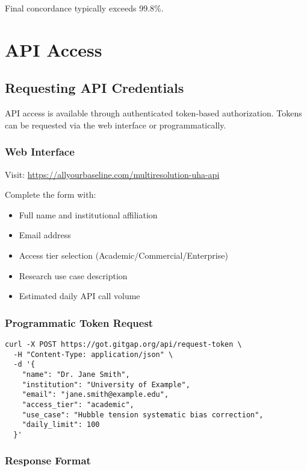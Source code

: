 \documentclass[11pt]{article}
\begin{document}
Final concordance typically exceeds 99.8\%.

\section{API Access}

\subsection{Requesting API Credentials}

API access is available through authenticated token-based authorization. Tokens can be requested via the web interface or programmatically.

\subsubsection{Web Interface}

Visit: \url{https://allyourbaseline.com/multiresolution-uha-api}

Complete the form with:
\begin{itemize}
    \item Full name and institutional affiliation
    \item Email address
    \item Access tier selection (Academic/Commercial/Enterprise)
    \item Research use case description
    \item Estimated daily API call volume
\end{itemize}

\subsubsection{Programmatic Token Request}

\begin{lstlisting}[style=bash, caption={cURL token request}]
curl -X POST https://got.gitgap.org/api/request-token \
  -H "Content-Type: application/json" \
  -d '{
    "name": "Dr. Jane Smith",
    "institution": "University of Example",
    "email": "jane.smith@example.edu",
    "access_tier": "academic",
    "use_case": "Hubble tension systematic bias correction",
    "daily_limit": 100
  }'
\end{lstlisting}

\subsubsection{Response Format}
\end{document}
